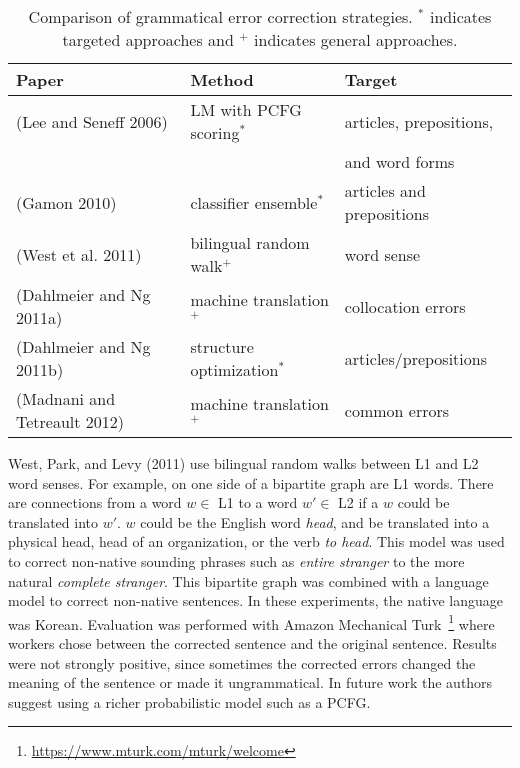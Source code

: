 \begin{table}[t]
    \begin{center}
    \begin{tabular}{lll}
        \hline
        \hline
        \textbf{Paper} & \textbf{Method} & \textbf{Target} \\
        \hline
        (Lee and Seneff 2006) & LM with PCFG scoring$^*$ & articles, prepositions,\\
                              & & and word forms \\
        (Gamon 2010) & classifier ensemble$^*$ & articles and prepositions \\
        (West et al. 2011) & bilingual random walk$^+$ & word sense \\
        (Dahlmeier and Ng 2011a) & machine translation$^+$ & collocation errors \\
        (Dahlmeier and Ng 2011b) & structure optimization$^*$ & articles/prepositions \\
        (Madnani and Tetreault 2012) & machine translation$^+$ & common errors\\
        \hline
        \hline
    \end{tabular}
    \caption{Comparison of grammatical error correction strategies. $^*$
    indicates targeted approaches and $^+$ indicates general approaches.}
    \label{table:gec}
    \end{center}
\end{table}

West, Park, and Levy (2011) use bilingual random walks between L1 and L2 word senses. For
example, on one side of a bipartite graph are L1 words. There are connections
from a word $w\in$ L1 to a word $w'\in$ L2 if a $w$ could be translated into
$w'$. $w$ could be the English word \emph{head}, and be translated into a
physical head, head of an organization, or the verb \emph{to head}. This model
was used to correct non-native sounding phrases such as \emph{entire stranger} to
the more natural \emph{complete stranger}. This bipartite graph was combined with
a language model to correct non-native sentences. In these experiments, the
native language was Korean. Evaluation was performed with Amazon Mechanical
Turk~\footnote{\url{https://www.mturk.com/mturk/welcome}} where workers chose
between the corrected sentence and the original sentence. Results were not
strongly positive, since sometimes the corrected errors changed the meaning of
the sentence or made it ungrammatical. In future work the authors suggest using
a richer probabilistic model such as a PCFG.

